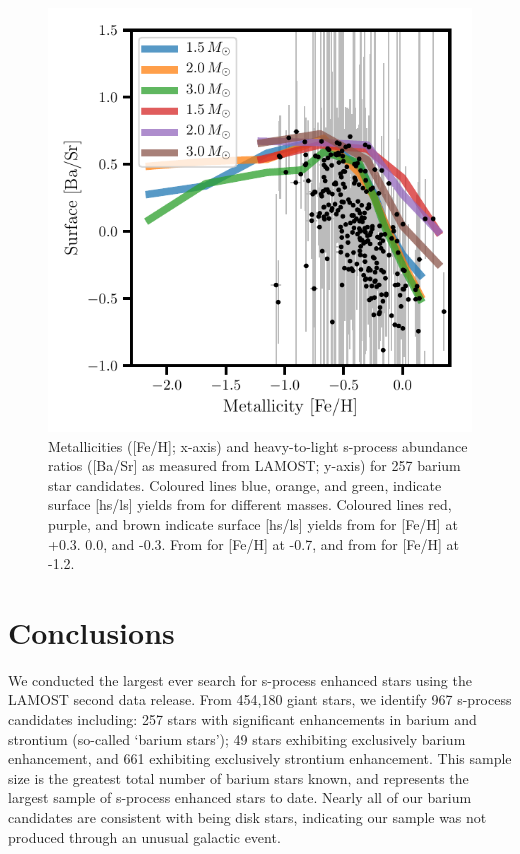 \documentclass[a4paper,fleqn,usenatbib]{mnras}
\begin{document}
\begin{figure}
	\includegraphics[width=\columnwidth]{yields_test.pdf}
    \caption{Metallicities ([Fe/H]; x-axis) and heavy-to-light s-process abundance ratios ([Ba/Sr] as measured from LAMOST; y-axis) for 257 barium star candidates. Coloured lines blue, orange, and green, indicate surface [hs/ls] yields from \citet{cristallo2015} for different masses. Coloured lines red, purple, and brown indicate surface [hs/ls] yields from \citet{karakas_lugaro2016} for [Fe/H] at +0.3. 0.0, and -0.3. From \citet{karakas2018} for [Fe/H] at -0.7, and from \citet{fishlock2014} for [Fe/H] at -1.2.}
    \label{fig:figure3}
\end{figure}


\section{Conclusions} \label{sec:con}

We conducted the largest ever search for s-process enhanced stars using the LAMOST second data release. From 454,180 giant stars, we identify 967 s-process candidates including: 257 stars with significant enhancements in barium and strontium (so-called `barium stars'); 49 stars exhibiting exclusively barium enhancement, and 661 exhibiting exclusively strontium enhancement. This sample size is the greatest total number of barium stars known, and represents the largest sample of s-process enhanced stars to date. Nearly all of our barium candidates are consistent with being disk stars, indicating our sample was not produced through an unusual galactic event. 
\end{document}
